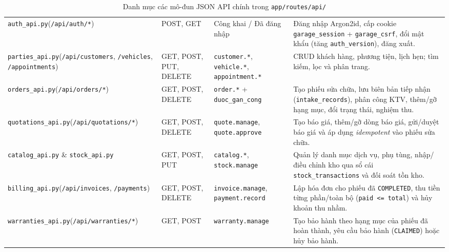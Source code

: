 \begin{table}[H]
\centering
\small
\caption{Danh mục các mô-đun JSON API chính trong \texttt{app/routes/api/}}
\label{tab:g-api-catalog}
\begin{tabularx}{\textwidth}{|L{4.0cm}|C{1.8cm}|L{3.1cm}|Y|}
\hline
{} &  &  & \\
\hline
\texttt{auth\_api.py}\newline(\texttt{/api/auth/*}) & POST, GET & Công khai / Đã đăng nhập & Đăng nhập Argon2id, cấp cookie \texttt{garage\_session} + \texttt{garage\_csrf}, đổi mật khẩu (tăng \texttt{auth\_version}), đăng xuất. \\
\hline
\texttt{parties\_api.py}\newline(\texttt{/api/customers}, \texttt{/vehicles}, \texttt{/appointments}) & GET, POST, PUT, DELETE & \texttt{customer.*}, \texttt{vehicle.*}, \texttt{appointment.*} & CRUD khách hàng, phương tiện, lịch hẹn; tìm kiếm, lọc và phân trang. \\
\hline
\texttt{orders\_api.py}\newline(\texttt{/api/orders/*}) & GET, POST, DELETE & \texttt{order.*} + \texttt{duoc\_gan\_cong} & Tạo phiếu sửa chữa, lưu biên bản tiếp nhận (\texttt{intake\_records}), phân công KTV, thêm/gỡ hạng mục, đổi trạng thái, nghiệm thu. \\
\hline
\texttt{quotations\_api.py}\newline(\texttt{/api/quotations/*}) & GET, POST, DELETE & \texttt{quote.manage}, \texttt{quote.approve} & Tạo báo giá, thêm/gỡ dòng báo giá, gửi/duyệt báo giá và áp dụng \textit{idempotent} vào phiếu sửa chữa. \\
\hline
\texttt{catalog\_api.py} \& \texttt{stock\_api.py} & GET, POST, PUT & \texttt{catalog.*}, \texttt{stock.manage} & Quản lý danh mục dịch vụ, phụ tùng, nhập/điều chỉnh kho qua sổ cái \texttt{stock\_transactions} và đối soát tồn kho. \\
\hline
\texttt{billing\_api.py}\newline(\texttt{/api/invoices}, \texttt{/payments}) & GET, POST, DELETE & \texttt{invoice.manage}, \texttt{payment.record} & Lập hóa đơn cho phiếu đã \texttt{COMPLETED}, thu tiền từng phần/toàn bộ (\texttt{paid <= total}) và hủy khoản thu nhầm. \\
\hline
\texttt{warranties\_api.py}\newline(\texttt{/api/warranties/*}) & GET, POST & \texttt{warranty.manage} & Tạo bảo hành theo hạng mục của phiếu đã hoàn thành, yêu cầu bảo hành (\texttt{CLAIMED}) hoặc hủy bảo hành. \\

\end{tabularx}
\end{table}

